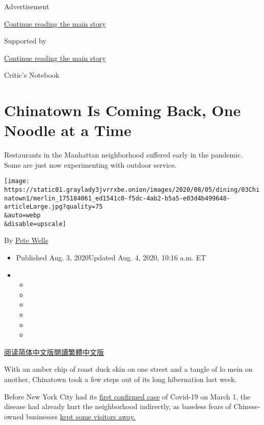Advertisement

\protect\hyperlink{after-top}{Continue reading the main story}

Supported by

\protect\hyperlink{after-sponsor}{Continue reading the main story}

Critic's Notebook

\hypertarget{chinatown-is-coming-back-one-noodle-at-a-time}{%
\section{Chinatown Is Coming Back, One Noodle at a
Time}\label{chinatown-is-coming-back-one-noodle-at-a-time}}

Restaurants in the Manhattan neighborhood suffered early in the
pandemic. Some are just now experimenting with outdoor service.

\texttt{[image: https://static01.graylady3jvrrxbe.onion/images/2020/08/05/dining/03Chinatown1/merlin\_175184061\_ed1541c0-f5dc-4ab2-b5a5-e03d4b499648-articleLarge.jpg?quality=75\\\&auto=webp\\\&disable=upscale]}

By \href{https://www.nytimes3xbfgragh.onion/by/pete-wells}{Pete Wells}

\begin{itemize}
\item
  Published Aug. 3, 2020Updated Aug. 4, 2020, 10:16 a.m. ET
\item
  \begin{itemize}
  \item
  \item
  \item
  \item
  \item
  \item
  \end{itemize}
\end{itemize}

\href{https://cn.nytimes3xbfgragh.onion/style/20200804/chinatown-outdoor-dining-coronavirus/}{阅读简体中文版}\href{https://cn.nytimes3xbfgragh.onion/style/20200804/chinatown-outdoor-dining-coronavirus/zh-hant/}{閱讀繁體中文版}

With an amber chip of roast duck skin on one street and a tangle of lo
mein on another, Chinatown took a few steps out of its long hibernation
last week.

Before New York City had its
\href{https://www.nytimes3xbfgragh.onion/2020/03/01/nyregion/new-york-coronvirus-confirmed.html}{first
confirmed case} of Covid-19 on March 1, the disease had already hurt the
neighborhood indirectly, as baseless fears of Chinese-owned businesses
\href{https://www.nytimes3xbfgragh.onion/2020/01/29/nyregion/coronavirus-nyc.html}{kept
some visitors away.}

